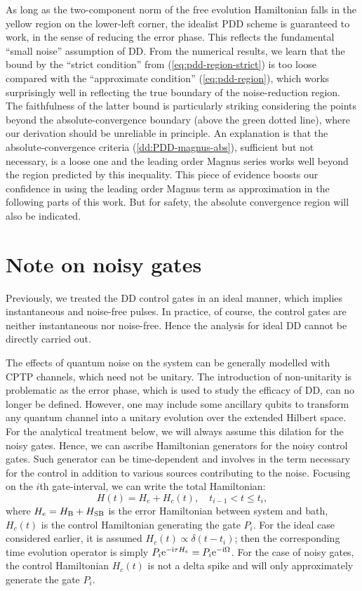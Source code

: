\documentclass[pra,reprint,superscriptaddress]{revtex4-2}
\begin{document}
{As long as the two-component norm of the free evolution Hamiltonian falls in the yellow region on the lower-left corner, the idealist PDD scheme is guaranteed to work, in the sense of reducing the error phase. This reflects the fundamental ``small noise'' assumption of DD. From the numerical results, we learn that the bound by the ``strict condition'' from (\ref{eq:pdd-region-strict}) is too loose compared with the ``approximate condition'' (\ref{eq:pdd-region}), which works surprisingly well in reflecting the true boundary of the noise-reduction region. The faithfulness of the latter bound is particularly striking considering the points beyond the absolute-convergence boundary (above the green dotted line), where our derivation should be unreliable in principle. An explanation is that the absolute-convergence criteria (\ref{dd:PDD-magnus-abs}), sufficient but not necessary, is a loose one and the leading order Magnus series works well beyond the region predicted by this inequality. This piece of evidence boosts our confidence in using the leading order Magnus term as approximation in the following parts of this work. But for safety, the absolute convergence region will also be indicated. 
}



\section{Note on noisy gates}
Previously, we treated the DD control gates in an ideal manner, which implies instantaneous and noise-free pulses. In practice, of course, the control gates are neither instantaneous nor noise-free. Hence the analysis for ideal DD cannot be directly carried out.

The effects of quantum noise on the system can be generally modelled with CPTP channels, which need not be unitary. The introduction of non-unitarity is problematic as the error phase, which is used to study the efficacy of DD, can no longer be defined.
However, one may include some ancillary qubits to transform any quantum channel into a unitary evolution over the extended Hilbert space. For the analytical treatment below, we will always assume this dilation for the noisy gates. Hence, we can ascribe Hamiltonian generators for the noisy control gates. 
Such generator can be time-dependent and involves in the term necessary for the control in addition to various sources contributing to the noise. 
Focusing on the $i$th gate-interval,  we can write the total Hamiltonian:
\begin{equation}\label{eq:noisy-Hamiltonian}
 H(t) = H_e + H_c(t), \quad t_{i-1}< t \le t_i,
\end{equation}
where $H_e=H_{\mathrm{B}}+H_{\mathrm{SB}}$ is the error Hamiltonian between system and bath, $H_c(t)$ is the control Hamiltonian generating the gate $P_i$.
For the ideal case considered earlier, it is assumed $H_c(t) \propto \delta(t-t_i)$; then the corresponding time evolution operator is simply $P_i \mathrm{e}^{-\mathrm{i} \tau H_e} =P_i \mathrm{e}^{-\mathrm{i} \Omega}$. For the case of noisy gates, the control Hamiltonian $H_c(t)$ is not a delta spike and will only approximately generate the gate $P_i$.
\end{document}
